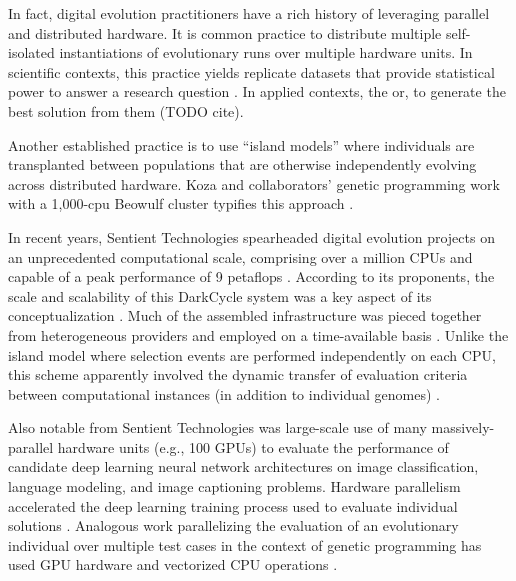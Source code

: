 In fact, digital evolution practitioners have a rich history of leveraging parallel and distributed hardware.
It is common practice to distribute multiple self-isolated instantiations of evolutionary runs over multiple hardware units.
In scientific contexts, this practice yields replicate datasets that provide statistical power to answer a research question \citep{dolson2017spatial}.
In applied contexts, the 
or,  to generate  the best solution from them (TODO cite).

Another established practice is to use ``island models'' where individuals are transplanted between populations that are otherwise independently evolving across distributed hardware.
Koza and collaborators' genetic programming work with a 1,000-cpu Beowulf cluster typifies this approach \citep{bennett1999building}.

In recent years, Sentient Technologies spearheaded digital evolution projects on an unprecedented computational scale, comprising over a million CPUs and capable of a peak performance of 9 petaflops \citep{miikkulainen2019evolving}.
According to its proponents, the scale and scalability of this DarkCycle system was a key aspect of its conceptualization \citep{gilbert_2015}.
Much of the assembled infrastructure was pieced together from heterogeneous providers and employed on a time-available basis \citep{blondeau2012distributed}.
Unlike the island model where selection events are performed independently on each CPU, this scheme apparently involved the dynamic transfer of evaluation criteria between computational instances (in addition to individual genomes) \citep{hodjat2013distributed}.

Also notable from Sentient Technologies was large-scale use of many massively-parallel hardware units (e.g., 100 GPUs) to evaluate the performance of candidate deep learning neural network architectures on image classification, language modeling, and image captioning problems.
Hardware parallelism accelerated the deep learning training process used to evaluate individual solutions \citep{miikkulainen2019evolving}.
Analogous work parallelizing the evaluation of an evolutionary individual over multiple test cases in the context of genetic programming has used GPU hardware and vectorized CPU operations \citep{harding2007fast2, langdon2019continuous}. %


